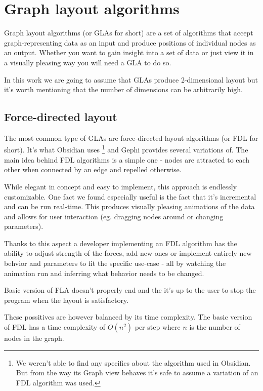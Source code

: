 \chapter{Graph layout algorithms}

Graph layout algorithms (or GLAs for short) are a set of algorithms that accept graph-representing data as an input
and produce positions of individual nodes as an output.
Whether you want to gain insight into a set of data or just view it in a visually pleasing way you will need a GLA to do so.

In this work we are going to assume that GLAs produce 2-dimensional layout
but it's worth mentioning that the number of dimensions can be arbitrarily high.

\section{Force-directed layout}

The most common type of GLAs are force-directed layout algorithms (or FDL for short). It's what Obsidian uses
\footnote{We weren't able to find any specifics about the algorithm used in Obsidian.
But from the way its Graph view behaves it's safe to assume a variation of an FDL algorithm was used.}
and Gephi provides several variations of.
The main idea behind FDL algorithms is a simple one - nodes are attracted to each other when connected by an edge and repelled otherwise.

While elegant in concept and easy to implement, this approach is endlessly customizable.
One fact we found especially useful is the fact that it's incremental and can be run real-time.
This produces visually pleasing animations of the data and allows for user interaction (eg. dragging nodes around or changing parameters).

Thanks to this aspect a developer implementing an FDL algorithm has the ability to adjust strength of the forces,
add new ones or implement entirely new behvior and parameters to fit the specific use-case
- all by watching the animation run and inferring what behavior needs to be changed.

Basic version of FLA doesn't properly end and the it's up to the user to stop the program when the layout is satisfactory.


These possitives are however balanced by its time complexity. The basic version of FDL has a time complexity of $O(n^2)$ per step
where $n$ is the number of nodes in the graph.

